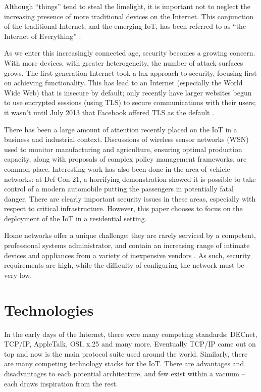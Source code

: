 \documentclass[10pt,journal,compsoc]{IEEEtran}
\begin{document}
Although ``things'' tend to steal the limelight, it is important not to neglect
the increasing presence of more traditional devices on the Internet. This
conjunction of the traditional Internet, and the emerging IoT, has been
referred to as ``the Internet of Everything'' \cite{CiscoEverything}. 

As we enter this increasingly connected age, security becomes a growing
concern. With more devices, with greater heterogeneity, the number of attack
surfaces grows. The first generation Internet took a lax approach to security,
focusing first on achieving functionality. This has lead to an Internet
(especially the World Wide Web) that is insecure by default; only recently have
larger websites begun to use encrypted sessions (using TLS) to secure
communications with their users; it wasn't until July 2013 that Facebook
offered TLS as the default \cite{Facebook2013}. 

There has been a large amount of attention recently placed on the IoT in a
business and industrial context. Discussions of wireless sensor networks (WSN)
used to monitor manufacturing and agriculture, ensuring optimal production
capacity, along with proposals of complex policy management frameworks, are
common place. Interesting work has also been done in the area of vehicle
networks: at Def Con 21, a horrifying demonstration showed it is possible to
take control of a modern automobile \cite{Illera2014} putting the passengers in
potentially fatal danger. There are clearly important security issues in these
areas, especially with respect to critical infrastructure. However, this paper
chooses to focus on the deployment of the IoT in a residential setting. 

Home networks offer a unique challenge: they are rarely serviced by a competent,
professional systems administrator, and  contain an increasing range of
intimate devices and appliances from a variety of inexpensive vendors
\cite{ACM_ModHome}. As such, security requirements are high, while the
difficulty of configuring the network must be very low. 


\section{Technologies}
In the early days of the Internet, there were many competing standards: DECnet,
TCP/IP, AppleTalk, OSI, x.25 and many more. Eventually TCP/IP came out on top
and now is the main protocol suite used around the world. Similarly, there are
many competing technology stacks for the IoT. There are advantages and
disadvantages to each potential architecture, and few exist within a vacuum --
each draws inspiration from the rest. 
\end{document}
